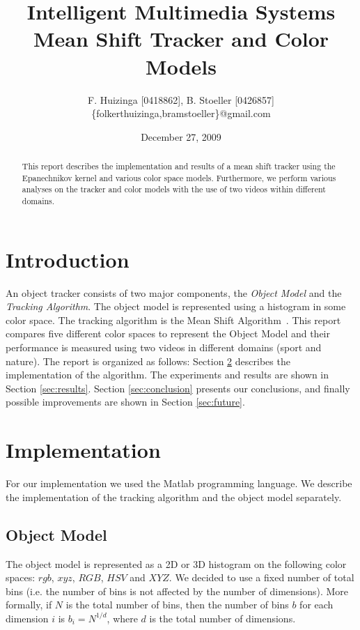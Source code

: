 \documentclass[11pt]{article}
\title{Intelligent Multimedia Systems \\ Mean Shift Tracker and Color Models}
\author{F. Huizinga [0418862], B. Stoeller [0426857] \\
      \{folkerthuizinga,bramstoeller\}@gmail.com}
\date{December 27, 2009}
\begin{document}
\maketitle

\begin{abstract}
This report describes the implementation and results of a mean shift tracker
using the Epanechnikov kernel and various color space models. Furthermore, we
perform various analyses on the tracker and color models with the use of two
videos within different domains.
\end{abstract}


\section{Introduction} \label{sec:intro}
An object tracker consists of two major components, the \emph{Object Model} and
the \emph{Tracking Algorithm}. The object model is represented using a
histogram in some color space. The tracking algorithm is the Mean Shift
Algorithm~\cite{kernel-basedobject, real-timetracking}. This report compares
five different color spaces to represent the Object Model and their performance
is measured using two videos in different domains (sport and nature). The
report is organized as follows:  Section \ref{sec:implementation} describes the
implementation of the algorithm. The experiments and results are shown in
Section \ref{sec:results}. Section \ref{sec:conclusion} presents our
conclusions, and finally possible improvements are shown in Section
\ref{sec:future}.


\section{Implementation} \label{sec:implementation}
For our implementation we used the Matlab programming language. We describe the
implementation of the tracking algorithm and the object model separately.

\subsection{Object Model} \label{sec:model}
The object model is represented as a 2D or 3D histogram on the following color
spaces: $rgb$, $xyz$, $RGB$, $HSV$ and $XYZ$. We decided to use a fixed number
of total bins (i.e. the number of bins is not affected by the number of
dimensions).  More formally, if $N$ is the total number of bins, then the number
of bins $b$ for each dimension $i$ is $b_i = N^{1/d}$, where $d$ is the total
number of dimensions. 
\end{document}
